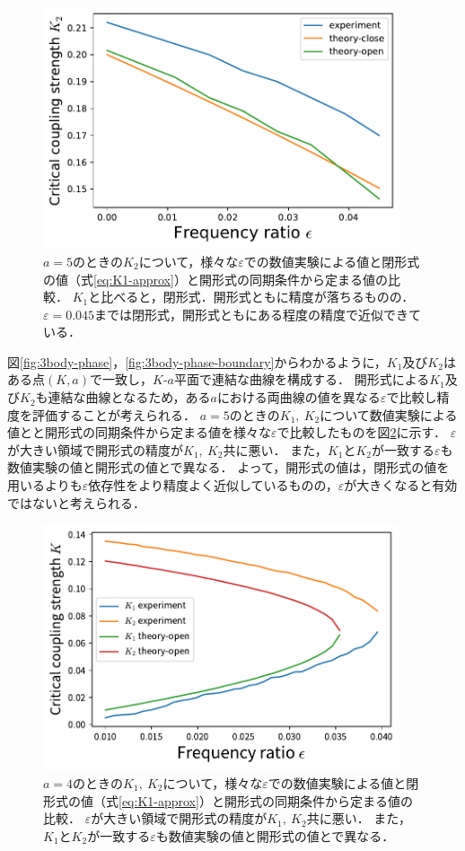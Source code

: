 \documentclass[../main]{subfiles}
\begin{document}
\begin{figure}[tbp]
\centering
\includegraphics[width=105mm]{./images/k2-compare.pdf}
\centering
\caption{$a=5$のときの$K_2$について，様々な$\varepsilon$での数値実験による値と閉形式の値（式\eqref{eq:K1-approx}）と開形式の同期条件から定まる値の比較．
$K_1$と比べると，閉形式．開形式ともに精度が落ちるものの．$\varepsilon=0.045$までは閉形式，開形式ともにある程度の精度で近似できている．}
\label{fig:k2-compare}
\end{figure}

図\ref{fig:3body-phase}，\ref{fig:3body-phase-boundary}からわかるように，$K_1$及び$K_2$はある点$(K,a)$で一致し，$K$-$a$平面で連結な曲線を構成する．
開形式による$K_1$及び$K_2$も連結な曲線となるため，ある$a$における両曲線の値を異なる$\varepsilon$で比較し精度を評価することが考えられる．
$a=5$のときの$K_1,\ K_2$について数値実験による値とと開形式の同期条件から定まる値を様々な$\varepsilon$で比較したものを図\ref{fig:k1k2-compare}に示す．
$\varepsilon$が大きい領域で開形式の精度が$K_1,\ K_2$共に悪い．
また，$K_1$と$K_2$が一致する$\varepsilon$も数値実験の値と開形式の値とで異なる．
よって，開形式の値は，閉形式の値を用いるよりも$\varepsilon$依存性をより精度よく近似しているものの，$\varepsilon$が大きくなると有効ではないと考えられる．

\begin{figure}[tbp]
\centering
\includegraphics[width=105mm]{./images/k1k2-compare.pdf}
\centering
\caption{$a=4$のときの$K_1,\ K_2$について，様々な$\varepsilon$での数値実験による値と閉形式の値（式\eqref{eq:K1-approx}）と開形式の同期条件から定まる値の比較．
$\varepsilon$が大きい領域で開形式の精度が$K_1,\ K_2$共に悪い．
また，$K_1$と$K_2$が一致する$\varepsilon$も数値実験の値と開形式の値とで異なる．}
\label{fig:k1k2-compare}
\end{figure}
\end{document}
